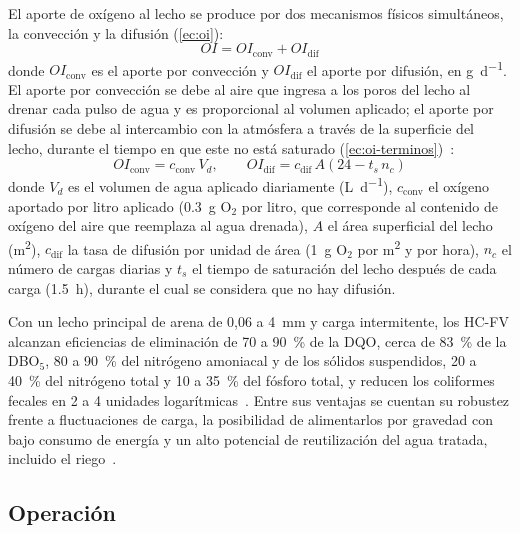 El aporte de oxígeno al lecho se produce por dos mecanismos físicos simultáneos, la convección y la difusión (\cref{ec:oi}):
\begin{equation}
  OI = OI_{\mathrm{conv}} + OI_{\mathrm{dif}}
  \label{ec:oi}
\end{equation}
donde $OI_{\mathrm{conv}}$ es el aporte por convección y $OI_{\mathrm{dif}}$ el aporte por difusión, en \unit{\gram\per\day}.
El aporte por convección se debe al aire que ingresa a los poros del lecho al drenar cada pulso de agua y es proporcional al volumen aplicado; el aporte por difusión se debe al intercambio con la atmósfera a través de la superficie del lecho, durante el tiempo en que este no está saturado (\cref{ec:oi-terminos})~\parencite{platzer1999design,dotro2021humedales}:
\begin{equation}
  OI_{\mathrm{conv}} = c_{\mathrm{conv}}\, V_d, \qquad OI_{\mathrm{dif}} = c_{\mathrm{dif}}\, A \left(24 - t_s\, n_c\right)
  \label{ec:oi-terminos}
\end{equation}
donde $V_d$ es el volumen de agua aplicado diariamente (\unit{\liter\per\day}), $c_{\mathrm{conv}}$ el oxígeno aportado por litro aplicado (\qty{0.3}{\gram} O$_2$ por litro, que corresponde al contenido de oxígeno del aire que reemplaza al agua drenada), $A$ el área superficial del lecho (\unit{\square\meter}), $c_{\mathrm{dif}}$ la tasa de difusión por unidad de área (\qty{1}{\gram} O$_2$ por \unit{\square\meter} y por hora), $n_c$ el número de cargas diarias y $t_s$ el tiempo de saturación del lecho después de cada carga (\qty{1.5}{\hour}), durante el cual se considera que no hay difusión.

Con un lecho principal de arena de 0,06 a \qty{4}{\milli\meter} y carga intermitente, los HC-FV alcanzan eficiencias de eliminación de 70 a \qty{90}{\percent} de la DQO, cerca de \qty{83}{\percent} de la DBO$_5$, 80 a \qty{90}{\percent} del nitrógeno amoniacal y de los sólidos suspendidos, 20 a \qty{40}{\percent} del nitrógeno total y 10 a \qty{35}{\percent} del fósforo total, y reducen los coliformes fecales en 2 a 4 unidades logarítmicas~\parencite{langergraber2021vertical}.
Entre sus ventajas se cuentan su robustez frente a fluctuaciones de carga, la posibilidad de alimentarlos por gravedad con bajo consumo de energía y un alto potencial de reutilización del agua tratada, incluido el riego~\parencite{langergraber2021vertical}.

\subsection{Operación}

